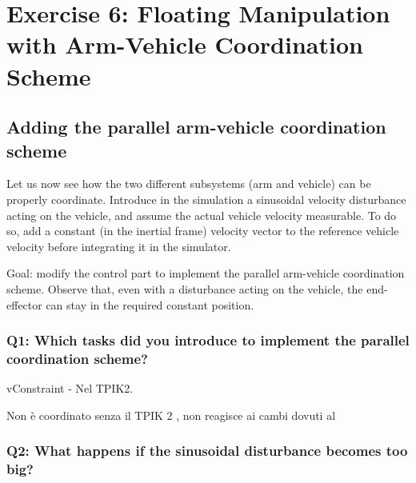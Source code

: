 \documentclass{article}
\begin{document}
\clearpage
\section{Exercise 6: Floating Manipulation with Arm-Vehicle Coordination Scheme}
\subsection{Adding the parallel arm-vehicle coordination scheme}
Let us now see how the two different subsystems (arm and vehicle) can be properly coordinate. Introduce in the simulation a sinusoidal velocity disturbance acting on the vehicle, and assume the actual vehicle velocity measurable. To do so, add a constant (in the inertial frame) velocity vector to the reference vehicle velocity before integrating it in the simulator. 

Goal: modify the control part to implement the parallel arm-vehicle coordination scheme. Observe that, even with a disturbance acting on the vehicle, the end-effector can stay in the required constant position.

\subsubsection{Q1: Which tasks did you introduce to implement the parallel coordination scheme?}

vConstraint - Nel TPIK2.

Non è coordinato senza il TPIK 2 , non reagisce ai cambi dovuti al 

\subsubsection{Q2: What happens if the sinusoidal disturbance becomes too big?}





		
\end{document}
